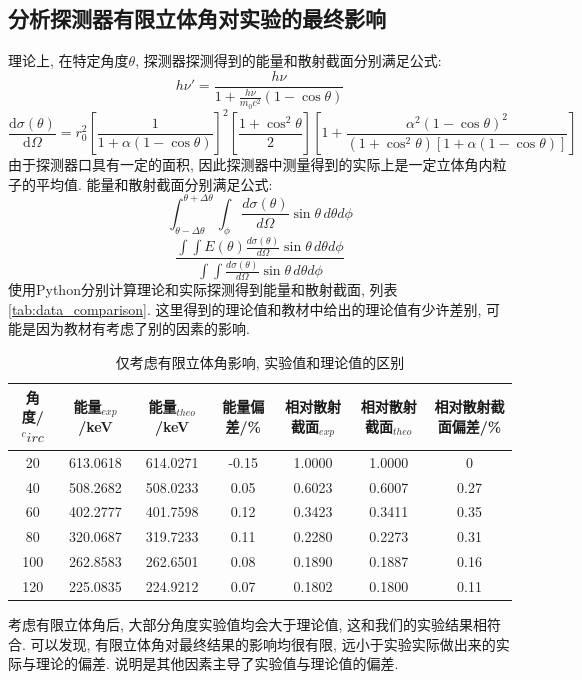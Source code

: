 \documentclass[font=default]{mpltx}
\begin{document}
    \subsection{分析探测器有限立体角对实验的最终影响}
      理论上, 在特定角度$\theta$, 探测器探测得到的能量和散射截面分别满足公式: 
      $$
      h\nu' = \frac{h\nu}{1 + \frac{h\nu}{m_0 c^2}(1 - \cos\theta)}
      $$
      $$
      \frac{\mathrm{d}\sigma(\theta)}{\mathrm{d}\Omega} = r_0^2 \left[ \frac{1}{1 + \alpha(1 - \cos\theta)} \right]^2 \left[ \frac{1 + \cos^2\theta}{2} \right] \left[ 1 + \frac{\alpha^2(1 - \cos\theta)^2}{(1 + \cos^2\theta)\left[ 1 + \alpha(1 - \cos\theta) \right]} \right]
      $$
      由于探测器口具有一定的面积, 因此探测器中测量得到的实际上是一定立体角内粒子的平均值. 能量和散射截面分别满足公式:
      $$
      \int_{\theta-\Delta\theta}^{\theta+\Delta\theta} \int_{\phi} \frac{d\sigma(\theta)}{d\Omega} \sin\theta \, d\theta d\phi    
      $$
      $$
      \frac{\int\int E(\theta) \frac{d\sigma(\theta)}{d\Omega} \sin\theta \, d\theta d\phi}{\int\int \frac{d\sigma(\theta)}{d\Omega} \sin\theta \, d\theta d\phi}
      $$
      使用Python分别计算理论和实际探测得到能量和散射截面, 列表\autoref{tab:data_comparison}.
      这里得到的理论值和教材\cite{jindaiwulishiyan}中给出的理论值有少许差别, 可能是因为教材有考虑了别的因素的影响. 
      
      \begin{table}[htbp]
        \centering
        \caption{仅考虑有限立体角影响, 实验值和理论值的区别}
        \begin{tabular}{ccccccc}
          \toprule
           角度/$^circ$ & 能量$_{exp}$/keV & 能量$_{theo}$/keV & 能量偏差/\% & 相对散射截面$_{exp}$ & 相对散射截面$_{theo}$ & 相对散射截面偏差/\%\\
          \midrule
           20 & 613.0618 & 614.0271 & -0.15 & 1.0000 & 1.0000 & 0\\
           40 & 508.2682 & 508.0233 & 0.05 & 0.6023 & 0.6007 & 0.27\\
           60 & 402.2777 & 401.7598 & 0.12 & 0.3423 & 0.3411 & 0.35 \\
           80 & 320.0687 & 319.7233 & 0.11 & 0.2280 & 0.2273 & 0.31\\
           100 & 262.8583 & 262.6501 & 0.08 & 0.1890 & 0.1887 & 0.16\\
           120 & 225.0835 & 224.9212 & 0.07 & 0.1802 & 0.1800 & 0.11\\
          \bottomrule
        \end{tabular}
        \label{tab:data_comparison}
      \end{table}
      考虑有限立体角后, 大部分角度实验值均会大于理论值, 这和我们的实验结果相符合. 
      可以发现, 有限立体角对最终结果的影响均很有限, 远小于实验实际做出来的实际与理论的偏差. 说明是其他因素主导了实验值与理论值的偏差. 
\end{document}
